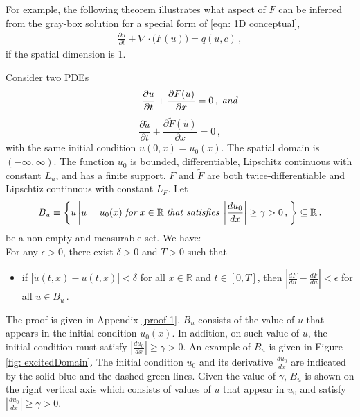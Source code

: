 For example, the following theorem illustrates what aspect of $F$ can be inferred from the gray-box
solution for a special form of \eqref{eqn: 1D conceptual},
\begin{equation*}\begin{split}
    \frac{\partial u}{\partial t}+ \nabla \cdot \big( F(u) \big) = q(u,c)\,,
\end{split}
\end{equation*}
if the spatial dimension is 1.
\begin{theorem}
    Consider two PDEs
    \begin{equation}
        \qquad\frac{\partial u}{\partial t} + \frac{\partial F(u)}{\partial x} = 0\,,\; \emph{and}
        \label{eqn: easy 1}
    \end{equation}
    \begin{equation}
        \frac{\partial \tilde{u}}{\partial t} + \frac{\partial \tilde{F}(\tilde{u})}{\partial x} = 0\,,
        \label{eqn: easy 2}
    \end{equation}
    with the same initial condition $u(0,x) = u_0(x)$. The spatial domain is $(-\infty, \infty)$. 
    The function $u_0$ is bounded, differentiable, 
    Lipschitz continuous with constant $L_u$, 
    and has a finite support. $F$ and $\tilde{F}$ are both twice-differentiable and Lipschtiz 
    continuous with constant $L_F$.
    Let 
    $$
    B_u \equiv \left\{ u\left| u=u_0(x) \; \emph{for}
    \; x \in \mathbb{R} \; \emph{that satisfies}\; \left|\frac{du_0}{dx}\right|\ge \gamma > 0
    \,,\right.
    \right\}
    \subseteq \mathbb{R}\,.
    $$
    be a non-empty and measurable set.
    We have:\\
    For any $\epsilon >0$, there exist $\delta>0$ and $T>0$ such that 
    \begin{itemize}
        \item if $|\tilde{u}(t,x)-u(t,x)| < \delta$ for all $x\in \mathbb{R}$ and $t\in [0,T]$, then
              $\left|\frac{d\tilde{F}}{du} - \frac{dF}{du}\right| < 
               \epsilon $ for all $u\in B_u\,.$
    \end{itemize}
    \label{theorem: 1}
\end{theorem}
The proof is given in Appendix \ref{proof 1}. $B_u$ consists of the value of $u$ that 
appears in the initial condition $u_0(x)$. In addition, on such value of $u$, the 
initial condition must satisfy $\left|\frac{du_0}{dx}\right|\ge \gamma > 0$.
An example of $B_u$ is given in Figure \ref{fig: excitedDomain}.
The initial condition $u_0$ and its derivative $\frac{du_0}{dx}$ are indicated by the
solid blue and the dashed green lines. Given the value of $\gamma$, 
$B_u$ is shown on the right vertical axis which consists of values of $u$ that appear in $u_0$
and satisfy $\left|\frac{du_0}{dx}\right|\ge \gamma > 0$.\\


